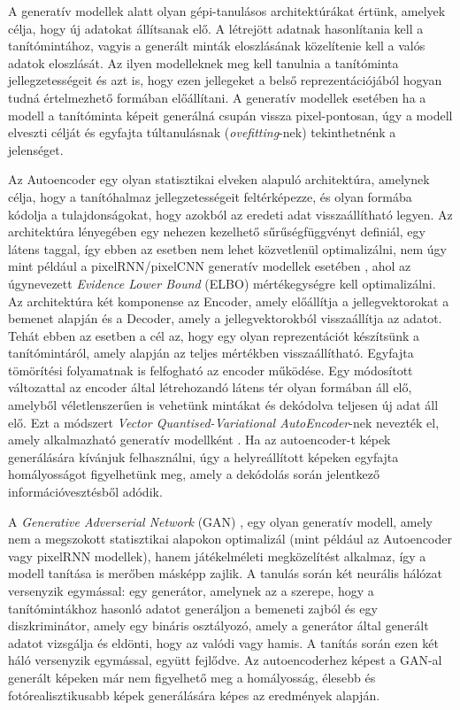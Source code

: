 A generatív modellek alatt olyan gépi-tanulásos architektúrákat értünk, amelyek célja, hogy új adatokat állítsanak elő. A létrejött adatnak hasonlítania kell a tanítómintához, vagyis a generált minták eloszlásának közelítenie kell a valós adatok eloszlását. Az ilyen modelleknek meg kell tanulnia a tanítóminta jellegzetességeit és azt is, hogy ezen jellegeket a belső reprezentációjából hogyan tudná értelmezhető formában előállítani. A generatív modellek esetében ha a modell a tanítóminta képeit generálná csupán vissza pixel-pontosan, úgy a modell elveszti célját és egyfajta túltanulásnak (\textit{ovefitting}-nek) tekinthetnénk a jelenséget.

Az Autoencoder egy olyan statisztikai elveken alapuló architektúra, amelynek célja, hogy a tanítóhalmaz jellegzetességeit feltérképezze, és olyan formába kódolja a tulajdonságokat, hogy azokból az eredeti adat visszaállítható legyen. Az architektúra lényegében egy nehezen kezelhető sűrűségfüggvényt definiál, egy látens taggal, így ebben az esetben nem lehet közvetlenül optimalizálni, nem úgy mint például a pixelRNN/pixelCNN generatív modellek esetében \cite{oord2016conditional}, ahol az úgynevezett \textit{Evidence Lower Bound} (ELBO) mértékegységre kell optimalizálni\cite{oord2017neural}. Az architektúra két komponense az Encoder, amely előállítja a jellegvektorokat a bemenet alapján és a Decoder, amely a jellegvektorokból visszaállítja az adatot. Tehát ebben az esetben a cél az, hogy egy olyan reprezentációt készítsünk a tanítómintáról, amely alapján az teljes mértékben visszaállítható. Egyfajta tömörítési folyamatnak is felfogható az encoder működése. Egy módosított változattal az encoder által létrehozandó látens tér olyan formában áll elő, amelyből véletlenszerűen is vehetünk mintákat és dekódolva teljesen új adat áll elő. Ezt a módszert \textit{Vector Quantised-Variational AutoEncoder}-nek nevezték el, amely alkalmazható generatív modellként \cite{oord2017neural}.
Ha az autoencoder-t képek generálására kívánjuk felhasználni, úgy a helyreállított képeken egyfajta homályosságot figyelhetünk meg, amely a dekódolás során jelentkező információvesztésből adódik.

A \textit{Generative Adverserial Network} (GAN) \cite{goodfellow2014generative}, egy olyan generatív modell, amely nem a megszokott statisztikai alapokon optimalizál (mint például az Autoencoder vagy pixelRNN modellek), hanem játékelméleti megközelítést alkalmaz, így a modell tanítása is merőben másképp zajlik.
A tanulás során két neurális hálózat versenyzik egymással: egy generátor, amelynek az a szerepe, hogy a tanítómintákhoz hasonló adatot generáljon a bemeneti zajból és egy diszkriminátor, amely egy bináris osztályozó, amely a generátor által generált adatot vizsgálja és eldönti, hogy az valódi vagy hamis.
A tanítás során ezen két háló versenyzik egymással, együtt fejlődve. Az autoencoderhez képest a GAN-al generált képeken már nem figyelhető meg a homályosság, élesebb és fotórealisztikusabb képek generálására képes az eredmények alapján.

